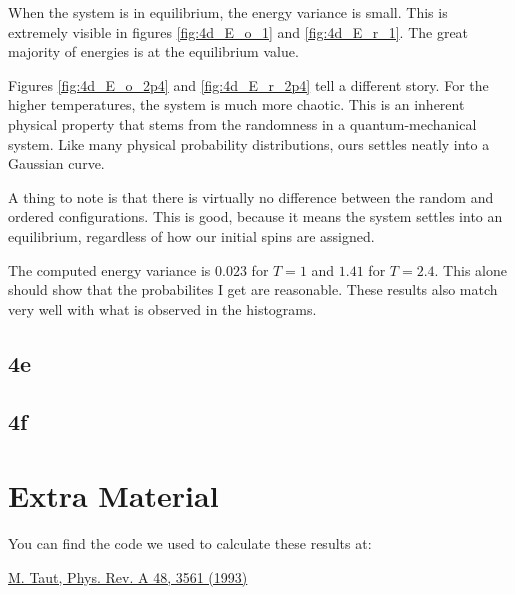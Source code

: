 \documentclass[10pt,showpacs,preprintnumbers,footinbib,amsmath,amssymb,aps,prl,twocolumn,groupedaddress,superscriptaddress,showkeys]{revtex4-1}
\begin{document}
When the system is in equilibrium, the energy variance is small. This is extremely visible in figures \ref{fig:4d_E_o_1} and \ref{fig:4d_E_r_1}. The great majority of energies is at the equilibrium value.

Figures \ref{fig:4d_E_o_2p4} and \ref{fig:4d_E_r_2p4} tell a different story. For the higher temperatures, the system is much more chaotic. This is an inherent physical property that stems from the randomness in a quantum-mechanical system. Like many physical probability distributions, ours settles neatly into a Gaussian curve.

A thing to note is that there is virtually no difference between the random and ordered configurations. This is good, because it means the system settles into an equilibrium, regardless of how our initial spins are assigned.

The computed energy variance is $0.023$ for $T = 1$ and $1.41$ for $T = 2.4$. This alone should show that the probabilites I get are reasonable. These results also match very well with what is observed in the histograms.
 
\subsection*{4e}

\subsection*{4f}



\section{Extra Material}
You can find the code we used to calculate these results at: 

\begin{thebibliography}{99}
\href{http://prola.aps.org/abstract/PRA/v48/i5/p3561_1}{M. Taut, Phys. Rev. A 48, 3561 (1993)}
\end{thebibliography}
\end{document}
